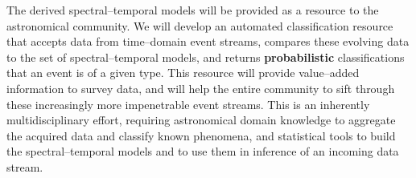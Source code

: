 \bigskip \centerline{}

The derived spectral--temporal models will be provided as a resource to the
astronomical community.  We will develop an automated classification resource
that accepts data from time--domain event streams, compares these evolving data
to the set of spectral--temporal models, and returns {\bf probabilistic}
classifications that an event is of a given type.  This resource will provide
value--added information to survey data, and will help the entire community to
sift through these increasingly more impenetrable event streams. This is an
inherently multidisciplinary effort, requiring astronomical domain knowledge to
aggregate the acquired data and classify known phenomena, and statistical tools
to build the spectral--temporal models and to use them in inference of an
incoming data stream.